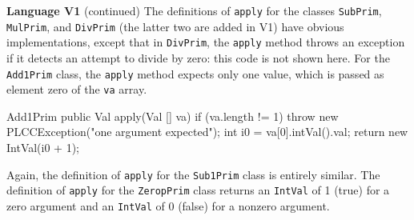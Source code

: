 \begin{minipage}[t]{\sw}
\slidenumber
\LARGE
{\bf Language V1} (continued)\exx
The definitions of \verb'apply' for the classes
\verb'SubPrim', \verb'MulPrim', and \verb'DivPrim'
(the latter two are added in V1)
have obvious implementations, except that in \verb'DivPrim',
the \verb'apply' method throws an exception
if it detects an attempt to divide by zero:
this code is not shown here.\exx
For the \verb'Add1Prim' class,
the \verb'apply' method expects only one value,
which is passed as element zero of the \verb'va' array.
{\Large
\begin{qv}
Add1Prim
    public Val apply(Val [] va) {
        if (va.length != 1)
            throw new PLCCException("one argument expected");
        int i0 = va[0].intVal().val;
        return new IntVal(i0 + 1);
    }
\end{qv}
}
Again, the definition of \verb'apply' for the \verb'Sub1Prim' class
is entirely similar.
The definition of \verb'apply' for the \verb'ZeropPrim' class
returns an \verb'IntVal' of 1 (true) for a zero argument
and an \verb'IntVal' of 0 (false) for a nonzero argument.
\end{minipage}
\clearpage
